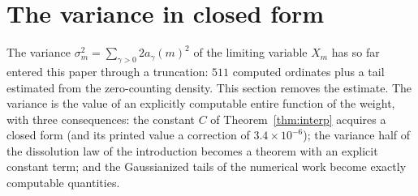 %
%

\section{The variance in closed form}\label{sec:variance}

The variance
$\sigma_m^2=\sum_{\gamma>0}2a_\gamma(m)^2$ of the limiting variable
$X_m$ has so far entered this paper through a truncation: $511$
computed ordinates plus a tail estimated from the zero-counting
density. This section removes the estimate. The variance is the value
of an explicitly computable entire function of the weight, with three
consequences: the constant $C$ of Theorem~\ref{thm:interp} acquires a
closed form (and its printed value a correction of $3.4\times10^{-6}$);
the variance half of the dissolution law of the introduction becomes a
theorem with an explicit constant term; and the Gaussianized tails of
the numerical work become exactly computable quantities.

